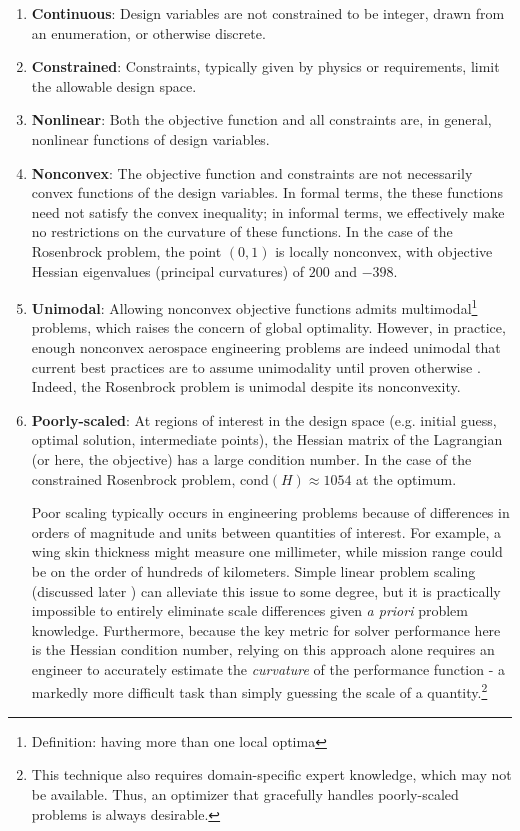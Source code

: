 \begin{enumerate}
    \item \textbf{Continuous}: Design variables are not constrained to be integer, drawn from an enumeration, or otherwise discrete.
    \item \textbf{Constrained}: Constraints, typically given by physics or requirements, limit the allowable design space.
    \item \textbf{Nonlinear}: Both the objective function and all constraints are, in general, nonlinear functions of design variables.
    \item \textbf{Nonconvex}: The objective function and constraints are not necessarily convex functions of the design variables. In formal terms, the these functions need not satisfy the convex inequality; in informal terms, we effectively make no restrictions on the curvature of these functions. In the case of the Rosenbrock problem, the point $(0, 1)$ is locally nonconvex, with objective Hessian eigenvalues (principal curvatures) of $200$ and $-398$.
    \item \textbf{Unimodal}: Allowing nonconvex objective functions admits multimodal\footnote{Definition: having more than one local optima} problems, which raises the concern of global optimality. However, in practice, enough nonconvex aerospace engineering problems are indeed unimodal that current best practices are to assume unimodality until proven otherwise \cite[p. 212]{mdobook}. Indeed, the Rosenbrock problem is unimodal despite its nonconvexity.
    \item \textbf{Poorly-scaled}: At regions of interest in the design space (e.g. initial guess, optimal solution, intermediate points), the Hessian matrix of the Lagrangian (or here, the objective) has a large condition number. In the case of the constrained Rosenbrock problem, $\text{cond}(H)\approx 1054$ at the optimum.

    Poor scaling typically occurs in engineering problems because of differences in orders of magnitude and units between quantities of interest. For example, a wing skin thickness might measure one millimeter, while mission range could be on the order of hundreds of kilometers. Simple linear problem scaling (discussed later%
    ) can alleviate this issue to some degree, but it is practically impossible to entirely eliminate scale differences given \textit{a priori} problem knowledge. Furthermore, because the key metric for solver performance here is the Hessian condition number, relying on this approach alone requires an engineer to accurately estimate the \textit{curvature} of the performance function - a markedly more difficult task than simply guessing the scale of a quantity.\footnote{This technique also requires domain-specific expert knowledge, which may not be available. Thus, an optimizer that gracefully handles poorly-scaled problems is always desirable.}

\end{enumerate}

